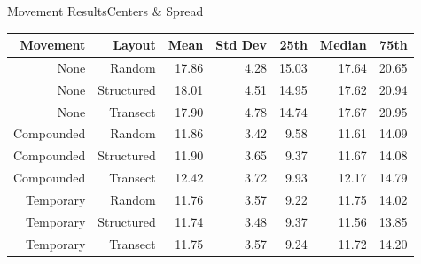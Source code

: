 \documentclass{beamer}
\begin{document}
\begin{frame}{Movement Results}{Centers \& Spread}
	\begin{table}
	
		\begin{tabular}{ r r| r r| r r r}
			Movement  & Layout     & Mean  & Std Dev & 25th  & Median & 75th  \\ \hline\hline
			None      & Random     & 17.86 & 4.28    & 15.03 & 17.64  & 20.65 \\
			None      & Structured & 18.01 & 4.51    & 14.95 & 17.62  & 20.94 \\
			None      & Transect   & 17.90 & 4.78    & 14.74 & 17.67  & 20.95 \\ \hline
			Compounded & Random     & 11.86 & 3.42    & 9.58  & 11.61  & 14.09 \\
			Compounded & Structured & 11.90 & 3.65    & 9.37  & 11.67  & 14.08 \\
			Compounded & Transect   & 12.42 & 3.72    & 9.93  & 12.17  & 14.79 \\ \hline
			Temporary & Random     & 11.76 & 3.57    & 9.22  & 11.75  & 14.02 \\
			Temporary & Structured & 11.74 & 3.48    & 9.37  & 11.56  & 13.85 \\
			Temporary & Transect   & 11.75 & 3.57    & 9.24  & 11.72  & 14.20
		\end{tabular}
	
	\end{table}
\end{frame}
\end{document}
